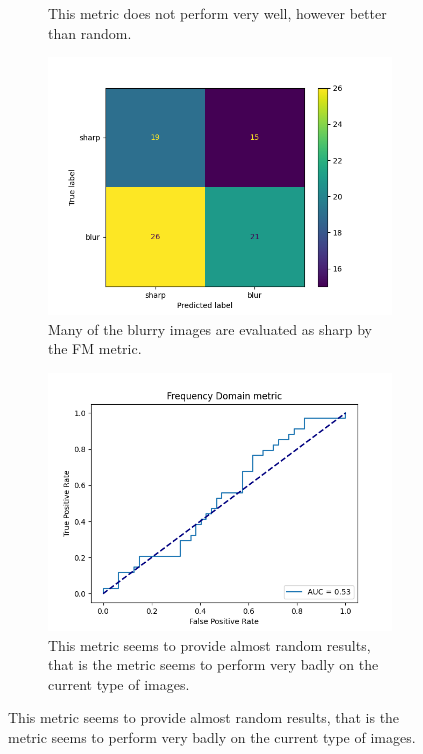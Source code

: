 \begin{figure}[H]
\begin{subfigure}[t]{0.49\textwidth}
        \caption{This metric does not perform very well, however better than random.}
        \label{fig:hf_roc}
    \end{subfigure}
    \begin{subfigure}[t]{0.49\textwidth}
        \centering
        \includegraphics[width=\textwidth]{Figures/BlurredImages/output_FM_conf_mat.png}
        \caption{Many of the blurry images are evaluated as sharp by the FM metric.}
        \label{fig:hf_conf_mat}
    \end{subfigure}
    \hfill
    \begin{subfigure}[t]{0.49\textwidth}
        \centering
        \includegraphics[width=\textwidth]{Figures/BlurredImages/output_FM_roc.png}
        \caption{This metric seems to provide almost random results, that is the metric seems to perform very badly on the current type of images.}
        \label{fig:hf_roc}
    \end{subfigure}
\end{figure}


